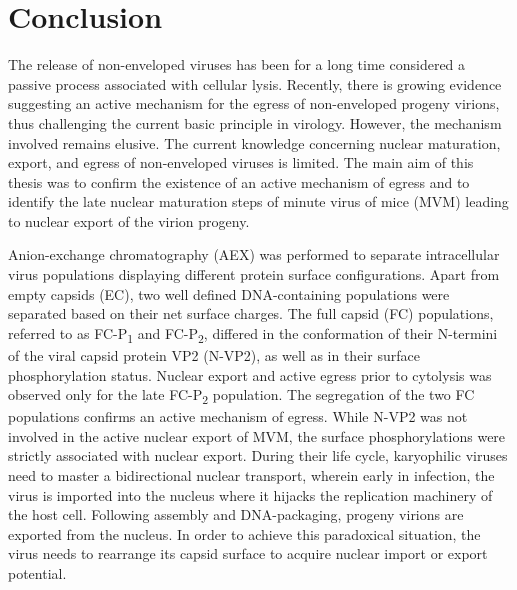 
\chapter{Conclusion} %

\label{Conclusion} %


\graphicspath{{./Pictures/}}

\newcommand*\circled[1]{\tikz[baseline=(char.base)]{\node[shape=circle,draw,black,inner sep=0.3pt] (char) {#1};}}

The release of non-enveloped viruses has been for a long time considered a passive process associated with cellular lysis. Recently, there is growing evidence suggesting an active mechanism for the egress of non-enveloped progeny virions, thus challenging the current basic principle in virology. However, the mechanism involved remains elusive. The current knowledge concerning nuclear maturation, export, and egress of non-enveloped viruses is limited. The main aim of this thesis was to confirm the existence of an active mechanism of egress and to identify the late nuclear maturation steps of minute virus of mice (MVM) leading to nuclear export of the virion progeny. 
    
\par
\medskip
Anion-exchange chromatography (AEX) was performed to separate intracellular virus populations displaying different protein surface configurations. Apart from empty capsids (EC), two well defined DNA-containing populations were separated based on their net surface charges. The full capsid (FC) populations, referred to as FC-P\textsubscript{1} and FC-P\textsubscript{2}, differed in the conformation of their N-termini of the viral capsid protein VP2 (N-VP2), as well as in their surface phosphorylation status. Nuclear export and active egress prior to cytolysis was observed only for the late FC-P\textsubscript{2} population. The segregation of the two FC populations confirms an active mechanism of egress. While N-VP2 was not involved in the active nuclear export of MVM, the surface phosphorylations were strictly associated with nuclear export. During their life cycle, karyophilic viruses need to master a bidirectional nuclear transport, wherein early in infection, the virus is imported into the nucleus where it hijacks the replication machinery of the host cell. Following assembly and DNA-packaging, progeny virions are exported from the nucleus. In order to achieve this paradoxical situation, the virus needs to rearrange its capsid surface to acquire nuclear import or export potential. 


